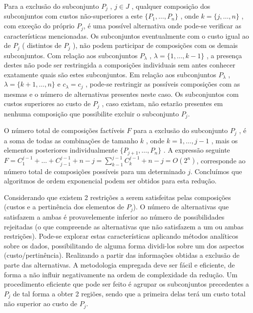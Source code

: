 \documentclass[a4paper,10pt]{article}
\begin{document}
Para a exclusão do subconjunto $P_{j}$ , $ j \in J$ , qualquer composição dos subconjuntos com custos não-superiores a este $ \{ P_{1}, \dots , P_{n} \} $ , onde $k =\{ j, \dots ,n \}$ , com exceção do próprio $P_{j}$, é uma possível alternativa onde pode-se verificar as características mencionadas. Os subconjuntos eventualmente com o custo igual ao de $P_{j}$ ( distintos de $P_{j}$ ), não podem participar de composições com os demais subconjuntos. Com relação aos subconjuntos $P_{ \lambda }$ , $ \lambda = \{ 1, \dots , k-1 \}$ , a presença destes não pode ser restringida a composições individuais sem antes conhecer exatamente quais são estes subconjuntos. Em relação aos subconjuntos $P_{ \lambda } $ , $ \lambda = \{ k+1, \dots , n \}$ e $c_{ \lambda } = c_{j}$ , pode-se restringir as possíveis composições com as mesmas e o número de alternativas presentes neste caso. Os subconjuntos com custos superiores ao custo de $P_{j}$ , caso existam, não estarão presentes em nenhuma composição que possibilite excluir o subconjunto $P_{j}$. 

O número total de composições factíveis $F$ para a exclusão do subconjunto $P_{j}$ , é a soma de todas as combinações de tamanho $k$ , onde $k = 1, \dots ,j-1$ , mais os elementos posteriores individualmente $ \{ P_{j+1} , \dots , P_{n} \} $ . A expressão seguinte $F=C ^{j-1} _{1} + \dots + C ^{j-1} _{j-1} + n - j = \sum ^{j-1} _{k-1} C ^{j-1} _{k} + n - j = O ( 2^{n} ) $, corresponde ao número total de composições possíveis para um determinado $j$. Concluímos que algoritmos de ordem exponencial podem ser obtidos para esta redução.

Considerando que existem 2 restrições a serem satisfeitas pelas composições (custos e a pertinência dos elementos de $P_{j}$). O número de alternativas que satisfazem a ambas é provavelemente inferior ao número de possibilidades rejeitadas (o que compreende as alternativas que não satisfazem a um ou ambas restrições). Pode-se explorar estas características aplicando métodos analíticos sobre os dados, possibilitando de alguma forma dividi-los sobre um dos aspectos (custo/pertinência). Realizando a partir das informações obtidas a exclusão de parte das alternativas. A metodologia empregada deve ser fácil e eficiente, de forma a não influir negativamente na ordem de complexidade da redução. Um procedimento eficiente que pode ser feito é agrupar os subconjuntos precedentes a $P_{j}$ de tal forma a obter 2 regiões, sendo que a primeira delas terá um custo total não superior ao custo de $P_{j}$.  
\end{document}
